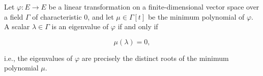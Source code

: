 Let $\varphi: E \to E$ be a linear transformation on a finite-dimensional vector space over a field $\Gamma$ of characteristic $0$, and let $\mu \in \Gamma[t]$ be the minimum polynomial of $\varphi$. A scalar $\lambda \in \Gamma$ is an eigenvalue of $\varphi$ if and only if

$$\mu(\lambda) = 0,$$

i.e., the eigenvalues of $\varphi$ are precisely the distinct roots of the minimum polynomial $\mu$.
